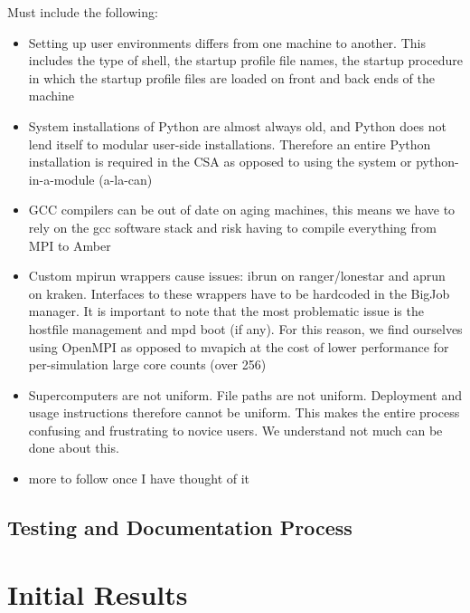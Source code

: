 \documentclass{sig-alternate}
\begin{document}
Must include the following:
\begin{itemize}
 \item Setting up user environments differs from one machine to another. This
includes the type of shell, the startup profile file names, the startup
procedure in which the startup profile files are loaded on front and back ends
of the machine
 \item System installations of Python are almost always old, and Python does not
lend itself to modular user-side installations. Therefore an entire Python
installation is required in the CSA as opposed to using the system or
python-in-a-module (a-la-can)
 \item GCC compilers can be out of date on aging machines, this means we have
to rely on the gcc software stack and risk having to compile everything from MPI
to Amber
 \item Custom mpirun wrappers cause issues: ibrun on ranger/lonestar and aprun
on kraken. Interfaces to these wrappers have to be hardcoded in the BigJob
manager. It is important to note that the most problematic issue is the hostfile
management and mpd boot (if any). For this reason, we find ourselves using
OpenMPI as opposed to mvapich at the cost of lower performance for
per-simulation large core counts (over 256)
 \item Supercomputers are not uniform. File paths are not uniform. Deployment
and usage instructions therefore cannot be uniform. This makes the entire
process confusing and frustrating to novice users. We understand not much can
be done about this.
 \item more to follow once I have thought of it
\end{itemize}





\subsection{Testing and Documentation Process}

\section{Initial Results} 
\end{document}
